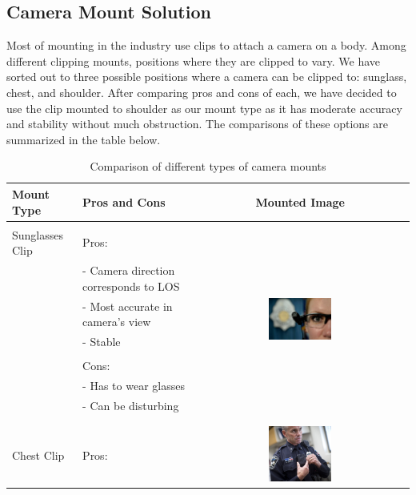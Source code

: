 \documentclass[12pt]{article}
\begin{document}
\subsection{Camera Mount Solution}

Most of mounting in the industry use clips to attach a camera on a body. Among
different clipping mounts, positions where they are clipped to vary. We have
sorted out to three possible positions where a camera can be clipped to:
sunglass, chest, and shoulder. After comparing pros and cons of each, we have
decided to use the clip mounted to shoulder as our mount type as it has
moderate accuracy and stability without much obstruction. The comparisons of
these options are summarized in the table below.

\begin{table}[h!]
    \centering
    \caption{Comparison of different types of camera mounts}
    \begin{tabular}{|l|l|c|}
        \hline
        \textbf{Mount Type} & \textbf{Pros and Cons} & \textbf{Mounted Image}\\
        \hline
        & & \\
        Sunglasses Clip & Pros: & \multirow{8}{*}{\includegraphics[width=0.3\textwidth]{glasses_mount}}\\
                        & - Camera direction corresponds to LOS & \\
                        & - Most accurate in camera's view & \\
                        & - Stable & \\
                        & & \\
                        & Cons: & \\
                        & - Has to wear glasses & \\
                        & - Can be disturbing & \\
        & & \\
        \hline
        & & \\
        Chest Clip & Pros: & \multirow{8}{*}{\includegraphics[width=0.3\textwidth]{chest_mount}}\\

\end{tabular}
\end{table}
\end{document}
